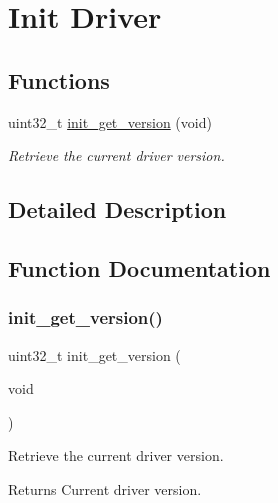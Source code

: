 \hypertarget{group__doc__driver__hal__helper__init}{}\section{Init Driver}
\label{group__doc__driver__hal__helper__init}
\subsection*{Functions}
\begin{DoxyCompactItemize}
\item 
uint32\+\_\+t \hyperlink{group__doc__driver__hal__helper__init_ga7f3a0a79c14d4043ea30435f561af05f}{init\+\_\+get\+\_\+version} (void)
\begin{DoxyCompactList}\small\item\em Retrieve the current driver version. \end{DoxyCompactList}\end{DoxyCompactItemize}


\subsection{Detailed Description}


\subsection{Function Documentation}
\mbox{\label{group__doc__driver__hal__helper__init_ga7f3a0a79c14d4043ea30435f561af05f}} 
\subsubsection{\texorpdfstring{init\+\_\+get\+\_\+version()}{init\_get\_version()}}
{\footnotesize\ttfamily uint32\+\_\+t init\+\_\+get\+\_\+version (\begin{DoxyParamCaption}\item[{void}]{ }\end{DoxyParamCaption})}



Retrieve the current driver version. 

\begin{DoxyReturn}{Returns}
Current driver version. 
\end{DoxyReturn}
